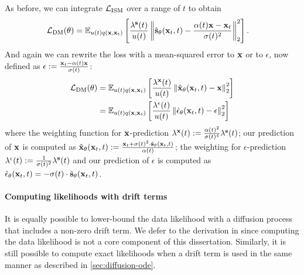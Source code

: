 As before, we can integrate ${\mathcal{L}}_\text{ISM}$ over a range of $t$ to obtain
\begin{align} \label{eq:general-dm-loss-s}
    {\mathcal{L}}_\text{DM}(\theta) &= \mathbb{E}_{u(t)q({\mathbf{x}}, {\mathbf{x}}_t)} \left[ \frac{\lambda^{\mathbf{s}}(t)}{u(t)} \left\| \hat{{\mathbf{s}}}_\theta({\mathbf{x}}_t, t) - \frac{\alpha(t) {\mathbf{x}}-{\mathbf{x}}_t}{\sigma(t)^2} \right\|_2^2 \right].
\end{align}
And again we can rewrite the loss with a mean-squared error to ${\mathbf{x}}$ or to $\epsilon$, now defined as $\epsilon := \frac{{\mathbf{x}}_t-\alpha(t){\mathbf{x}}}{\sigma(t)}$:
\begin{align} \label{eq:general-dm-loss}
    {\mathcal{L}}_\text{DM}(\theta) &= \mathbb{E}_{u(t)q({\mathbf{x}}, {\mathbf{x}}_t)} \left[ \frac{\lambda^{\mathbf{x}}(t)}{u(t)} \left\| \hat{{\mathbf{x}}}_\theta({\mathbf{x}}_t, t) - {\mathbf{x}} \right\|_2^2 \right] \\
     &= \mathbb{E}_{u(t)q({\mathbf{x}}, {\mathbf{x}}_t)} \left[ \frac{\lambda^\epsilon(t)}{u(t)} \left\| \hat{\mathbf{\epsilon}}_\theta({\mathbf{x}}_t, t) - \epsilon \right\|_2^2 \right] \label{eq:diffusion-general-epsilon-prediction}
\end{align}
where the weighting function for ${\mathbf{x}}$-prediction $\lambda^{\mathbf{x}}(t) := \frac{\alpha(t)^2}{\sigma(t)^4}\lambda^{\mathbf{s}}(t)$; our prediction of ${\mathbf{x}}$ is computed as $\hat{{\mathbf{x}}}_\theta({\mathbf{x}}_t, t) := \frac{{\mathbf{x}}_t + \sigma(t)^2 \cdot \hat{{\mathbf{s}}}_\theta({\mathbf{x}}_t, t)}{\alpha(t)}$; the weighting for $\epsilon$-prediction $\lambda^\epsilon(t) := \frac{1}{\sigma(t)^2} \lambda^{\mathbf{s}}(t)$ and our prediction of $\epsilon$ is computed as $\hat{\mathbf{\epsilon}}_\theta({\mathbf{x}}_t, t) = - \sigma(t) \cdot \hat{{\mathbf{s}}}_\theta({\mathbf{x}}_t, t)$.

\paragraph{Computing likelihoods with drift terms}
It is equally possible to lower-bound the data likelihood with a diffusion process that includes a non-zero drift term. We defer to the derivation in \citet{kingma2021variational} since computing the data likelihood is not a core component of this dissertation. Similarly, it is still possible to compute exact likelihoods when a drift term is used in the same manner as described in \cref{sec:diffusion-ode}.